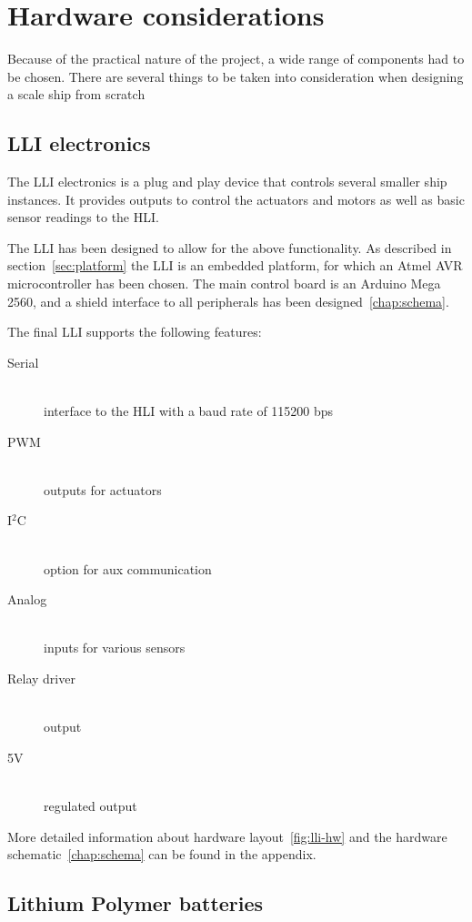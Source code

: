 \chapter{Hardware considerations}

Because of the practical nature of the project, a wide range of components had to be chosen. There are several things to be taken into consideration when designing a scale ship from scratch

\section{LLI electronics}
The \ac{LLI} electronics is a plug and play device that controls several smaller ship instances. It provides outputs to control the actuators and motors as well as basic sensor readings to the \ac{HLI}.

The \ac{LLI} has been designed to allow for the above functionality. As described in section~\vref{sec:platform} the \ac{LLI} is an embedded platform, for which an Atmel AVR microcontroller has been chosen. The main control board is an Arduino Mega 2560, and a shield interface to all peripherals has been designed~\vref{chap:schema}.

The final LLI supports the following features:
\begin{description}
\item[Serial]\hfill \\ interface to the \ac{HLI} with a baud rate of 115200 bps
\item[PWM]\hfill \\ outputs for actuators
\item[I$^2$C]\hfill \\ option for aux communication
\item[Analog]\hfill \\ inputs for various sensors
\item[Relay driver]\hfill \\ output
\item[5V]\hfill \\ regulated output
\end{description}

More detailed information about hardware layout~\vref{fig:lli-hw} and the hardware schematic~\vref{chap:schema} can be found in the appendix.

\section{Lithium Polymer batteries}

